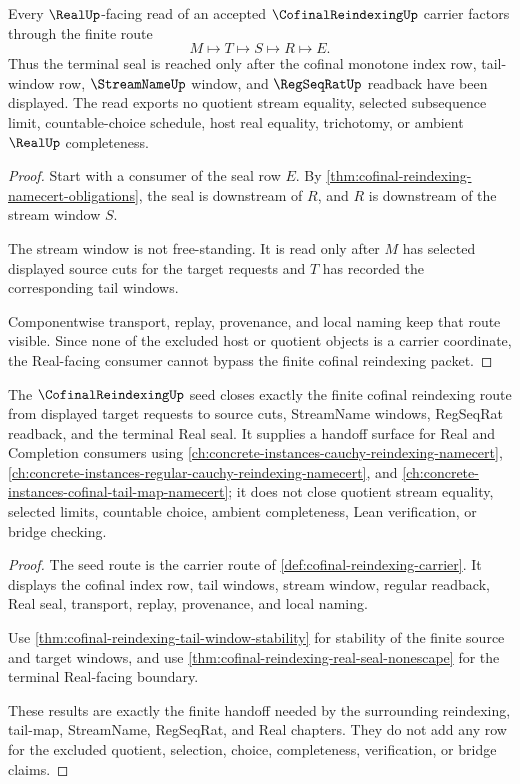 \begin{theorem}
\label{thm:cofinal-reindexing-real-seal-nonescape}
Every $\RealUp$-facing read of an accepted $\CofinalReindexingUp$ carrier factors through the finite route
$$
M \longmapsto T \longmapsto S \longmapsto R \longmapsto E .
$$
Thus the terminal seal is reached only after the cofinal monotone index row, tail-window row, $\StreamNameUp$ window, and $\RegSeqRatUp$ readback have been displayed. The read exports no quotient stream equality, selected subsequence limit, countable-choice schedule, host real equality, trichotomy, or ambient $\RealUp$ completeness.
\end{theorem}
\begin{proof}
Start with a consumer of the seal row $E$. By \autoref{thm:cofinal-reindexing-namecert-obligations}, the seal is downstream of $R$, and $R$ is downstream of the stream window $S$.

The stream window is not free-standing. It is read only after $M$ has selected displayed source cuts for the target requests and $T$ has recorded the corresponding tail windows.

Componentwise transport, replay, provenance, and local naming keep that route visible. Since none of the excluded host or quotient objects is a carrier coordinate, the Real-facing consumer cannot bypass the finite cofinal reindexing packet.
\end{proof}

\begin{theorem}
\label{thm:cofinal-reindexing-seed-scope}
The $\CofinalReindexingUp$ seed closes exactly the finite cofinal reindexing route from displayed target requests to source cuts, StreamName windows, RegSeqRat readback, and the terminal Real seal. It supplies a handoff surface for Real and Completion consumers using \autoref{ch:concrete-instances-cauchy-reindexing-namecert}, \autoref{ch:concrete-instances-regular-cauchy-reindexing-namecert}, and \autoref{ch:concrete-instances-cofinal-tail-map-namecert}; it does not close quotient stream equality, selected limits, countable choice, ambient completeness, Lean verification, or bridge checking.
\end{theorem}
\begin{proof}
The seed route is the carrier route of \autoref{def:cofinal-reindexing-carrier}. It displays the cofinal index row, tail windows, stream window, regular readback, Real seal, transport, replay, provenance, and local naming.

Use \autoref{thm:cofinal-reindexing-tail-window-stability} for stability of the finite source and target windows, and use \autoref{thm:cofinal-reindexing-real-seal-nonescape} for the terminal Real-facing boundary.

These results are exactly the finite handoff needed by the surrounding reindexing, tail-map, StreamName, RegSeqRat, and Real chapters. They do not add any row for the excluded quotient, selection, choice, completeness, verification, or bridge claims.
\end{proof}

